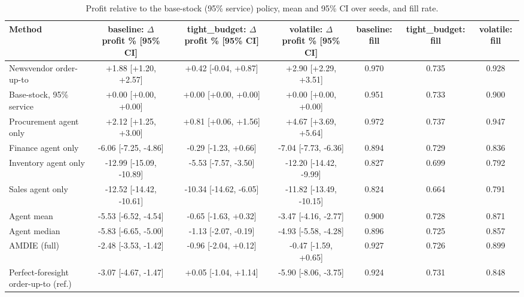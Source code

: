 \begin{table}[t]
\centering\small
\caption{Profit relative to the base-stock (95\% service) policy, mean and 95\% CI over seeds, and fill rate.}\label{tab:main}
\begin{tabular}{lcccccc}
\toprule
Method & baseline: $\Delta$ profit \% [95\% CI] & tight_budget: $\Delta$ profit \% [95\% CI] & volatile: $\Delta$ profit \% [95\% CI] & baseline: fill & tight_budget: fill & volatile: fill \\
\midrule
Newsvendor order-up-to & +1.88 [+1.20, +2.57] & +0.42 [-0.04, +0.87] & +2.90 [+2.29, +3.51] & 0.970 & 0.735 & 0.928 \\
Base-stock, 95\% service & +0.00 [+0.00, +0.00] & +0.00 [+0.00, +0.00] & +0.00 [+0.00, +0.00] & 0.951 & 0.733 & 0.900 \\
Procurement agent only & +2.12 [+1.25, +3.00] & +0.81 [+0.06, +1.56] & +4.67 [+3.69, +5.64] & 0.972 & 0.737 & 0.947 \\
Finance agent only & -6.06 [-7.25, -4.86] & -0.29 [-1.23, +0.66] & -7.04 [-7.73, -6.36] & 0.894 & 0.729 & 0.836 \\
Inventory agent only & -12.99 [-15.09, -10.89] & -5.53 [-7.57, -3.50] & -12.20 [-14.42, -9.99] & 0.827 & 0.699 & 0.792 \\
Sales agent only & -12.52 [-14.42, -10.61] & -10.34 [-14.62, -6.05] & -11.82 [-13.49, -10.15] & 0.824 & 0.664 & 0.791 \\
Agent mean & -5.53 [-6.52, -4.54] & -0.65 [-1.63, +0.32] & -3.47 [-4.16, -2.77] & 0.900 & 0.728 & 0.871 \\
Agent median & -5.83 [-6.65, -5.00] & -1.13 [-2.07, -0.19] & -4.93 [-5.58, -4.28] & 0.896 & 0.725 & 0.857 \\
AMDIE (full) & -2.48 [-3.53, -1.42] & -0.96 [-2.04, +0.12] & -0.47 [-1.59, +0.65] & 0.927 & 0.726 & 0.899 \\
Perfect-foresight order-up-to (ref.) & -3.07 [-4.67, -1.47] & +0.05 [-1.04, +1.14] & -5.90 [-8.06, -3.75] & 0.924 & 0.731 & 0.848 \\
\bottomrule
\end{tabular}
\end{table}

